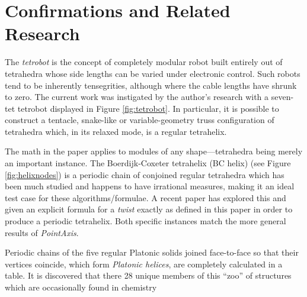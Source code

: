 \documentclass{svproc}
\begin{document}
\section{Confirmations and Related Research}

The {\em tetrobot}\cite{TetrobotBook} is the concept of completely
modular robot built entirely out of tetrahedra whose side lengths can
be varied under electronic control. Such robots tend to be inherently
tensegrities\cite{NTRT}, although where the cable lengths
have shrunk to zero.
The current work was instigated by the author's research with a seven-tet tetrobot
displayed in Figure
\ref{fig:tetrobot}.
In particular, it is possible to construct a tentacle, snake-like or
variable-geometry truss configuration of tetrahedra which, in its relaxed
mode, is a regular tetrahelix.

The math in the paper applies to modules of any shape---tetrahedra being
merely an important instance.
The Boerdijk-Coxeter tetrahelix (BC helix) (see Figure \ref{fig:helixnodes}) is a periodic chain of conjoined regular tetrahedra
which has been much studied\cite{coxeter1985simplicial,sadler2019periodic,fuller1982synergetics,read2018transforming}
and happens to have irrational measures, making it an ideal
test case for these algorithms/formulae. A recent paper\cite{sadler2019periodic} has explored this
and given an explicit formula for a {\em twist} exactly as defined in this
paper in order to produce a periodic tetrahelix. Both specific instances match the more general results of {\em PointAxis}.

Periodic chains of the five regular Platonic solids joined face-to-face so that their vertices coincide,
which form {\em Platonic helices}\cite{elgersma2016quadrahelix,lord2001sphere}, are completely calculated in a table\cite{readfullsegmentedhelix}.
It is discovered that there 28 unique members of this ``zoo'' of structures which are occasionally found in chemistry\cite{lord2004gamma,pearce1990structure}






\appendix
\end{document}
